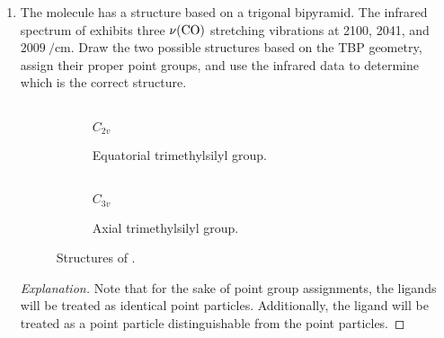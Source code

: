 \documentclass[../psets.tex]{subfiles}
\begin{document}
\begin{enumerate}[label={\Roman*)}]
\begin{proof}[Answer]
\begin{align*}
            \Gamma_{d_{xy}} &= (1,1,1,1) = A_g
        \end{align*}
    \end{proof}
    \newpage
    \item The molecule  has a structure based on a trigonal bipyramid. The infrared spectrum of  exhibits three $\nu(\ce{CO})$ stretching vibrations at 2100, 2041, and $\SI{2009}{\per\centi\meter}$. Draw the two possible structures based on the TBP geometry, assign their proper point groups, and use the infrared data to determine which is the correct structure.
    \begin{figure}[h!]
        \centering
        \begin{subfigure}[b]{0.35\linewidth}
            \centering
            \footnotesize
            \\
            \vspace{2em}
            $\boxed{C_{2v}}$\\
            \vspace{1em}
            \caption{Equatorial trimethylsilyl group.}
            \label{fig:structure-CoCO4SiMe3a}
        \end{subfigure}
        \begin{subfigure}[b]{0.35\linewidth}
            \centering
            \footnotesize
            \\
            \vspace{2em}
            $\boxed{C_{3v}}$\\
            \vspace{1em}
            \caption{Axial trimethylsilyl group.}
            \label{fig:structure-CoCO4SiMe3b}
        \end{subfigure}
        \caption{Structures of .}
        \label{fig:structure-CoCO4SiMe3}
    \end{figure}
    \begin{proof}[Explanation]
        Note that for the sake of point group assignments, the  ligands will be treated as identical point particles. Additionally, the  ligand will be treated as a point particle distinguishable from the  point particles.\par\medskip 

\end{proof}
\end{enumerate}
\end{document}
